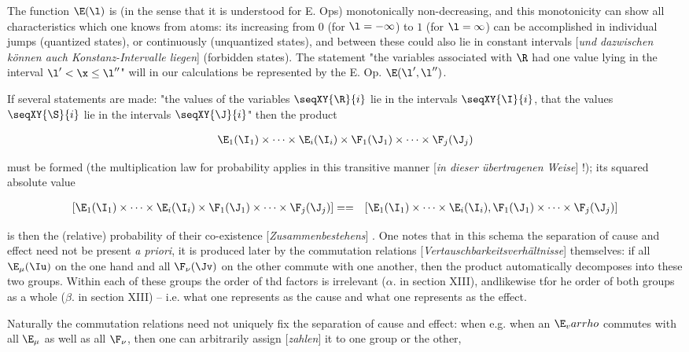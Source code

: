 \documentclass{article}
\newcommand{\WTF}[1]{
[\it{\small{#1}}]
}
\newcommand{\uequ}[1]{
\begin{align*}
#1
\end{align*}
}
\renewcommand{\it}[1]{\textit{#1}}
\begin{document}
The function $\E(\l)$ is (in the sense that it is understood for E. Ops) monotonically non-decreasing, and this monotonicity can show all characteristics which one knows from atoms: its increasing from $0$ (for $\l=-\infty$) to $1$ (for $\l=\infty$) can be accomplished in individual jumps (quantized states), or continuously (unquantized states), and between these could also lie in constant intervals\WTF{und dazwischen können auch Konstanz-Intervalle liegen} (forbidden states). The statement "the variables associated with $\R$ had one value lying in the interval $\l'<\x\leq \l''$" will in our calculations be represented by the E. Op. $\E(\l',\l'')$.

If several statements are made: "the values of the variables $\seqXY{\R}{i}$ lie in the intervals $\seqXY{\I}{i}$, that the values $\seqXY{\S}{i}$ lie in the intervals $\seqXY{\J}{i}$" then the product
\uequ{
\E_1(\I_1)\times\dots\times\E_i(\I_i)\times\F_1(\J_1)\times\dots\times\F_j(\J_j)
}
must be formed (the multiplication law for probability applies in this transitive manner\WTF{in dieser übertragenen Weise}!); its squared absolute value
\uequ{
&[\E_1(\I_1)\times\dots\times\E_i(\I_i)\times\F_1(\J_1)\times\dots\times\F_j(\J_j)] =
 = &[\E_1(\I_1)\times\dots\times\E_i(\I_i), \F_1(\J_1)\times\dots\times\F_j(\J_j)]
}

is then the (relative) probability of their co-existence\WTF{Zusammenbestehens}. One notes that in this schema the separation of cause and effect need not be present \it{a priori}, it is produced later by the commutation relations\WTF{Vertauschbarkeitsverhältnisse} themselves: if all $\E_\mu(\Iu)$ on the one hand and all $\F_\nu(\Jv)$ on the other commute with one another, then the product automatically decomposes into these two groups. Within each of these groups the order of thd factors is irrelevant ($\alpha.$ in section XIII), andlikewise tfor he order of both groups as a whole ($\beta.$ in section XIII) -- i.e. what one represents as the cause and what one represents as the effect.

Naturally the commutation relations need not uniquely fix the separation of cause and effect: when e.g. when an $\E_varrho$ commutes with all $\E_\mu$ as well as all $\F_\nu$, then one can arbitrarily assign\WTF{zahlen} it to one group or the other,
\end{document}
